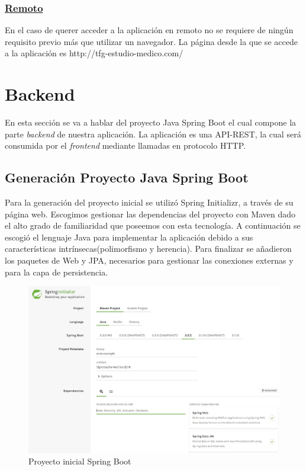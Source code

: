         \subsubsection{\underline{Remoto}}
        En el caso de querer acceder a la aplicación en remoto no se requiere de ningún requisito previo más que utilizar un navegador. La página desde la que se accede a la aplicación es http://tfg-estudio-medico.com/
    
    
    \section{Backend}
    
     En esta sección se va a hablar del proyecto Java Spring Boot el cual compone la parte \textit{backend} de nuestra aplicación. La aplicación es una API-REST, la cual será consumida por el \textit{frontend} mediante llamadas en protocolo HTTP. 
     
     
    \subsection{Generación Proyecto Java Spring Boot}
    Para la generación del proyecto inicial se utilizó Spring Initializr\cite{springinitializr}, a través de su página web. Escogimos gestionar las dependencias del proyecto con Maven dado el alto grado de familiaridad que poseemos con esta tecnología. A continuación se escogió el lenguaje Java para implementar la aplicación debido a sus características intrínsecas(polimorfismo y herencia). Para finalizar se añadieron los paquetes de Web y JPA, necesarios para gestionar las conexiones externas y para la capa de persistencia.
    
    \begin{figure}[h]
    \centering
     \includegraphics[width=1\textwidth]{images/springstarter}
    \caption{Proyecto inicial Spring Boot}
    \end{figure}
    

